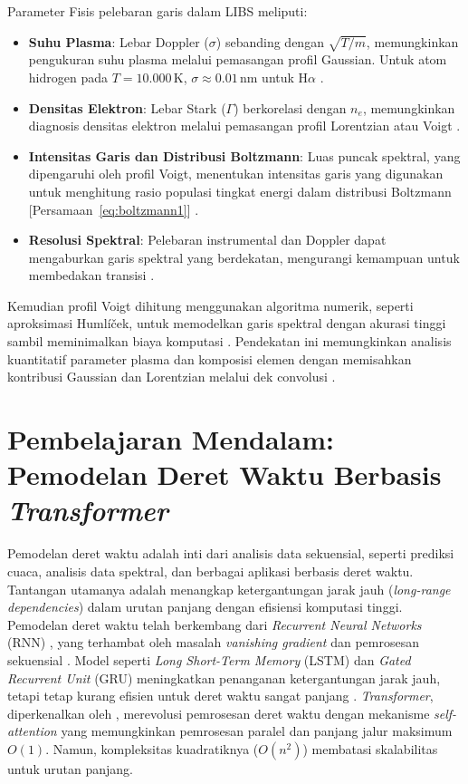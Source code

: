Parameter Fisis pelebaran garis dalam LIBS meliputi:
\begin{itemize}
  \item \textbf{Suhu Plasma}: Lebar Doppler (\( \sigma \)) sebanding dengan \( \sqrt{T/m} \), memungkinkan pengukuran suhu plasma melalui pemasangan profil Gaussian. Untuk atom hidrogen pada \( T = 10.000 \, \text{K} \), \( \sigma \approx 0.01 \, \text{nm} \) untuk H\(\alpha\) \citep{Demtroder2010}.
  \item \textbf{Densitas Elektron}: Lebar Stark (\( \Gamma \)) berkorelasi dengan \( n_e \), memungkinkan diagnosis densitas elektron melalui pemasangan profil Lorentzian atau Voigt \citep{Griem1997,Konjevic1999}.
  \item \textbf{Intensitas Garis dan Distribusi Boltzmann}: Luas puncak spektral, yang dipengaruhi oleh profil Voigt, menentukan intensitas garis yang digunakan untuk menghitung rasio populasi tingkat energi dalam distribusi Boltzmann [Persamaan~\eqref{eq:boltzmann1}] \citep{Miziolek2006}.
  \item \textbf{Resolusi Spektral}: Pelebaran instrumental dan Doppler dapat mengaburkan garis spektral yang berdekatan, mengurangi kemampuan untuk membedakan transisi \citep{Aragon2008}.
\end{itemize}

Kemudian profil Voigt dihitung menggunakan algoritma numerik, seperti aproksimasi Humlíček, untuk memodelkan garis spektral dengan akurasi tinggi sambil meminimalkan biaya komputasi \citep{Griem1997}. Pendekatan ini memungkinkan analisis kuantitatif parameter plasma dan komposisi elemen dengan memisahkan kontribusi Gaussian dan Lorentzian melalui dek convolusi \citep{Aragon2008}.

\section{Pembelajaran Mendalam: Pemodelan Deret Waktu Berbasis \textit{Transformer}}
\label{sec:transformer_informer}

Pemodelan deret waktu adalah inti dari analisis data sekuensial, seperti prediksi cuaca, analisis data spektral, dan berbagai aplikasi berbasis deret waktu. Tantangan utamanya adalah menangkap ketergantungan jarak jauh (\textit{long-range dependencies}) dalam urutan panjang dengan efisiensi komputasi tinggi. Pemodelan deret waktu telah berkembang dari \textit{Recurrent Neural Networks} (RNN) \citep{Bengio1994}, yang terhambat oleh masalah \textit{vanishing gradient} dan pemrosesan sekuensial \citep{Hochreiter1997}. Model seperti \textit{Long Short-Term Memory} (LSTM) dan \textit{Gated Recurrent Unit} (GRU) meningkatkan penanganan ketergantungan jarak jauh, tetapi tetap kurang efisien untuk deret waktu sangat panjang \citep{Hochreiter1997}. \textit{Transformer}, diperkenalkan oleh \citet{Vaswani2017}, merevolusi pemrosesan deret waktu dengan mekanisme \textit{self-attention} yang memungkinkan pemrosesan paralel dan panjang jalur maksimum \( O(1) \). Namun, kompleksitas kuadratiknya (\( O(n^2) \)) membatasi skalabilitas untuk urutan panjang.

